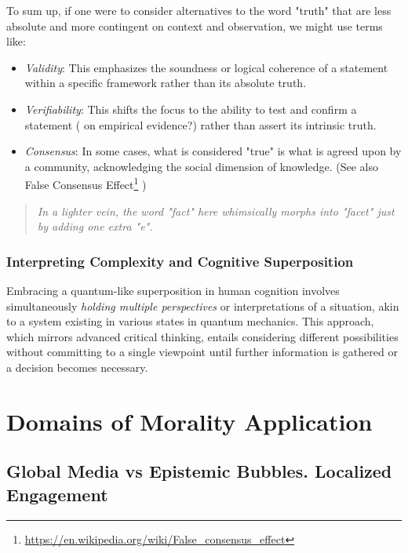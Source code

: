 \documentclass[11pt,a4]{article}
\begin{document}
    To sum up, if one were to consider alternatives to the word "truth"
    that are less absolute and more contingent on context and observation,
    we might use terms like:

    \begin{itemize}
        \item \textit{Validity}: This emphasizes the soundness or logical
        coherence of a statement within a specific framework rather than
        its absolute truth.
        \item \textit{Verifiability}: This shifts the focus to the ability
        to test and confirm a statement ( on empirical evidence?) rather
        than assert its intrinsic truth.
        \item \textit{Consensus}: In some cases, what is considered "true"
        is what is agreed upon by a community, acknowledging the social dimension of knowledge.
        (See also False Consensus Effect\footnote{\url{https://en.wikipedia.org/wiki/False_consensus_effect} } )

    \end{itemize}

    \begin{quote}
        \textit{In a lighter vein, the word "fact" here whimsically morphs into "facet" just by adding one extra "e".
    }
    \end{quote}



        \subsubsection{Interpreting Complexity and Cognitive Superposition}

        Embracing a quantum-like superposition in human cognition involves
        simultaneously \textit{holding multiple perspectives} or interpretations of a situation, akin to a
        system existing in various states in quantum mechanics. This approach, which mirrors advanced
        critical thinking, entails considering different possibilities without committing to a single
        viewpoint until further information is gathered or a decision becomes necessary.



\section{Domains of Morality Application  }
    \subsection{Global Media vs Epistemic Bubbles. Localized Engagement}
\end{document}
